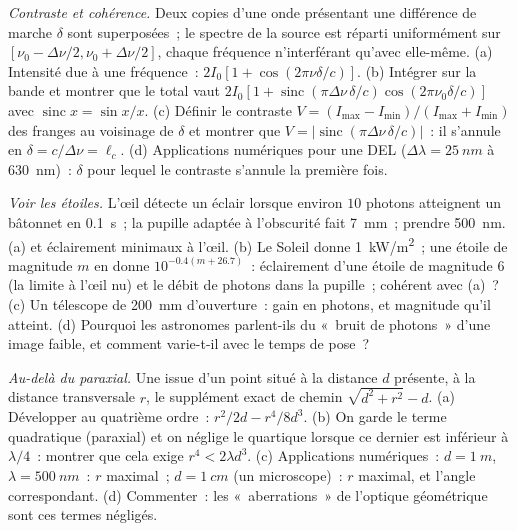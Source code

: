 \begin{exercise}[$\star\star\star$]\label{exo:b2:scalar-light-model:10}
\emph{Contraste et cohérence.} Deux copies d'une onde présentant une différence
de marche $\delta$ sont superposées~; le spectre de la source est réparti
uniformément sur $[\nu_0 - \Delta\nu/2, \nu_0 + \Delta\nu/2]$, chaque fréquence
n'interférant qu'avec elle-même. (a) Intensité due à une fréquence~: $2I_0
[1 + \cos(2\pi\nu\delta/c)]$. (b) Intégrer sur la bande et montrer que le
total vaut $2I_0[1 + \operatorname{sinc}(\pi\Delta\nu\,\delta/c)\cos(2\pi\nu_0\delta/c)]$ avec
$\operatorname{sinc}x = \sin x/x$. (c) Définir le contraste $V = (I_{\max} -
I_{\min})/(I_{\max} + I_{\min})$ des franges au voisinage de $\delta$ et montrer que $V =
|\operatorname{sinc}(\pi\Delta\nu\,\delta/c)|$~: il s'annule en $\delta = c/\Delta\nu = \ell_c$. (d)
Applications numériques pour une DEL ($\Delta\lambda = \qty{25}{nm}$ à \qty{630}{nm})~: $\delta$ pour lequel le
contraste s'annule la première fois.
\end{exercise}

\begin{exercise}[$\star\star\star$]\label{exo:b2:scalar-light-model:11}
\emph{Voir les étoiles.} L'œil détecte un éclair lorsque environ $10$ photons
atteignent un bâtonnet en \qty{0.1}{s}~; la pupille adaptée à l'obscurité fait \qty{7}{mm}~; prendre
\qty{500}{nm}. (a)  et éclairement minimaux à l'œil. (b) Le
Soleil donne \qty{1}{kW/m^2}~; une étoile de magnitude $m$ en donne $10^{-0.4(m + 26.7)}$~:
éclairement d'une étoile de magnitude 6 (la limite à l'œil nu) et le
débit de photons dans la pupille~; cohérent avec (a)~? (c) Un télescope de
\qty{200}{mm} d'ouverture~: gain en photons, et magnitude qu'il atteint.
(d) Pourquoi les astronomes parlent-ils du «~bruit de photons~» d'une image faible,
et comment varie-t-il avec le temps de pose~?
\end{exercise}

\begin{exercise}[$\star\star\star$]\label{exo:b2:scalar-light-model:12}
\emph{Au-delà du paraxial.} Une  issue d'un point situé à la distance $d$
présente, à la distance transversale $r$, le supplément exact de chemin $\sqrt{d^2 +
r^2} - d$. (a) Développer au quatrième ordre~: $r^2/2d - r^4/8d^3$. (b) On garde le terme
quadratique (paraxial) et on néglige le quartique lorsque ce dernier est inférieur à
$\lambda/4$~: montrer que cela exige $r^4 < 2\lambda d^3$. (c) Applications numériques~:
$d = \qty{1}{m}$, $\lambda = \qty{500}{nm}$~: $r$ maximal~; $d = \qty{1}{cm}$ (un microscope)~:
$r$ maximal, et l'angle correspondant. (d) Commenter~: les
«~aberrations~» de l'optique géométrique sont ces termes négligés.
\end{exercise}

